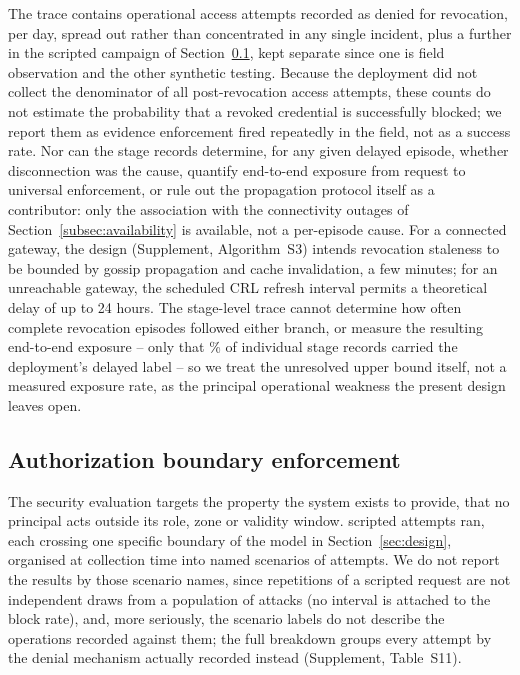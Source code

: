 \documentclass[a4paper,fleqn]{cas-sc}
\begin{document}
The trace contains \RevDenialsOperational{} operational access attempts
recorded as denied for revocation, \RevDenialsPerDay{} per day, spread out
rather than concentrated in any single incident, plus a further
\RevDenialsCampaign{} in the scripted campaign of
Section~\ref{subsec:security}, kept separate since one is field
observation and the other synthetic testing. Because the deployment did
not collect the denominator of all post-revocation access attempts, these
counts do not estimate the probability that a revoked credential is
successfully blocked; we report them as evidence enforcement fired
repeatedly in the field, not as a success rate. Nor can the stage records
determine, for any given delayed episode, whether disconnection was the
cause, quantify end-to-end exposure from request to universal enforcement,
or rule out the propagation protocol itself as a contributor: only the
association with the connectivity outages of
Section~\ref{subsec:availability} is available, not a per-episode cause.
For a connected gateway, the design (Supplement, Algorithm~S3) intends
revocation staleness to be bounded by gossip propagation and cache
invalidation, a few minutes; for an unreachable gateway, the scheduled
CRL refresh interval permits a theoretical delay of up to 24 hours. The
stage-level trace cannot determine how often complete revocation
episodes followed either branch, or measure the resulting end-to-end
exposure -- only that \RevDelayedPct\% of individual stage records
carried the deployment's delayed label -- so we treat the unresolved
upper bound itself, not a measured exposure rate, as the principal
operational weakness the present design leaves open.

\subsection{Authorization boundary enforcement}
\label{subsec:security}

The security evaluation targets the property the system exists to provide,
that no principal acts outside its role, zone or validity window.
\SecAttempts{} scripted attempts ran, each crossing one specific boundary of
the model in Section~\ref{sec:design}, organised at collection time into
\SecScenarios{} named scenarios of \SecPerScenario{} attempts. We do not
report the results by those scenario names, since repetitions of a
scripted request are not independent draws from a population of attacks
(no interval is attached to the block rate), and, more seriously, the
scenario labels do not describe the operations recorded against them; the
full breakdown groups every attempt by the denial mechanism actually
recorded instead (Supplement, Table~S11).
\end{document}
